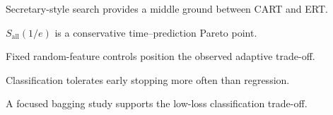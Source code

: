 \begin{highlights}
\item Secretary-style search provides a middle ground between CART and ERT.
\item $S_{\mathrm{all}}(1/e)$ is a conservative time--prediction Pareto point.
\item Fixed random-feature controls position the observed adaptive trade-off.
\item Classification tolerates early stopping more often than regression.
\item A focused bagging study supports the low-loss classification trade-off.
\end{highlights}
